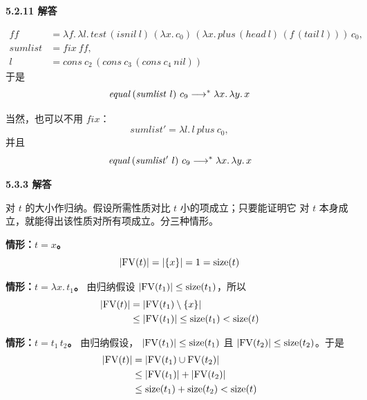 \begin{taplauthorsolutionentrybox}
\label{sol:author:5.2.11}
\textbf{5.2.11 解答}

\[
\begin{aligned}
\mathit{ff}
  &=\lambda f.\,\lambda l.\,
    \mathit{test}\,(\mathit{isnil}\ l)\,
      (\lambda x.\,c_0)\,
      (\lambda x.\,\mathit{plus}\,(\mathit{head}\ l)\,
        (f\,(\mathit{tail}\ l)))\,
      c_0,\\
\mathit{sumlist}
  &=\mathit{fix}\ \mathit{ff},\\
l&=\mathit{cons}\ c_2\,
   (\mathit{cons}\ c_3\,(\mathit{cons}\ c_4\ \mathit{nil}))
\end{aligned}
\]
于是
\[
  \mathit{equal}\,(\mathit{sumlist}\ l)\ c_9
  \mathrel{\longrightarrow^{*}} \lambda x.\,\lambda y.\,x
\]

当然，也可以不用 \(\mathit{fix}\)：
\[
  \mathit{sumlist'}=\lambda l.\,l\ \mathit{plus}\ c_0,
\]
并且
\[
  \mathit{equal}\,(\mathit{sumlist'}\ l)\ c_9
  \transmulti \lambda x.\,\lambda y.\,x
\]

\end{taplauthorsolutionentrybox}

\begin{taplauthorsolutionentrybox}
\label{sol:author:5.3.3}
\textbf{5.3.3 解答}

对 \(t\) 的大小作归纳。假设所需性质对比 \(t\) 小的项成立；只要能证明它
对 \(t\) 本身成立，就能得出该性质对所有项成立。分三种情形。

\medskip\noindent
\textbf{情形：\(t=x\)。}
\[
  \lvert\operatorname{FV}(t)\rvert=\lvert\{x\}\rvert=1=\operatorname{size}(t)
\]

\medskip\noindent
\textbf{情形：\(t=\lambda x.\,t_1\)。}
由归纳假设 \(\lvert\operatorname{FV}(t_1)\rvert\leq\operatorname{size}(t_1)\)，所以
\[
\begin{aligned}
\lvert\operatorname{FV}(t)\rvert
  &=\lvert\operatorname{FV}(t_1)\setminus\{x\}\rvert\\
  &\leq\lvert\operatorname{FV}(t_1)\rvert
  \leq\operatorname{size}(t_1)
  <\operatorname{size}(t)
\end{aligned}
\]

\medskip\noindent
\textbf{情形：\(t=t_1\,t_2\)。}
由归纳假设，
\(\lvert\operatorname{FV}(t_1)\rvert\leq\operatorname{size}(t_1)\) 且
\(\lvert\operatorname{FV}(t_2)\rvert\leq\operatorname{size}(t_2)\)。于是
\[
\begin{aligned}
\lvert\operatorname{FV}(t)\rvert
  &=\lvert\operatorname{FV}(t_1)\cup\operatorname{FV}(t_2)\rvert\\
  &\leq\lvert\operatorname{FV}(t_1)\rvert+\lvert\operatorname{FV}(t_2)\rvert\\
  &\leq\operatorname{size}(t_1)+\operatorname{size}(t_2)
  <\operatorname{size}(t)
\end{aligned}
\]

\end{taplauthorsolutionentrybox}

